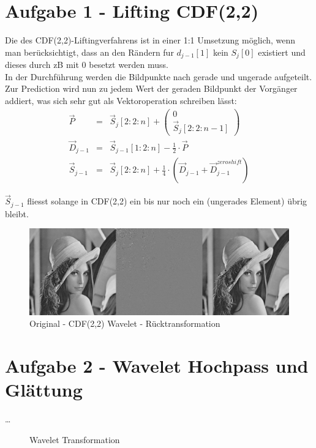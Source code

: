 



\newcommand{\nr}{5}
\lstset{language=matlab}


\section*{Aufgabe 1 - Lifting CDF(2,2)}
Die des CDF(2,2)-Liftingverfahrens ist in einer 1:1 Umsetzung m\"oglich,
wenn man ber\"ucksichtigt, dass an den R\"andern fur $d_{j-1}[1]$ kein
$S_{j}[0]$ existiert und dieses durch zB mit $0$ besetzt werden muss.
\\
In der Durchf\"uhrung werden die Bildpunkte nach gerade und ungerade 
aufgeteilt. Zur Prediction wird nun zu jedem Wert der geraden Bildpunkt 
der Vorg\"anger addiert, was sich sehr gut als Vektoroperation schreiben
l\"asst:
\\
\begin{eqnarray}
\vec{P} &=&  \vec{S}_{j}[2:2:n] + \left(\begin{array}{c}0\\\vec{S}_{j}[2:2:n-1]\end{array}\right)\\
\vec{D}_{j-1} &=&  \vec{S}_{j-1}[1:2:n] - \frac{1}{2} \cdot \vec{P}\\
\vec{S}_{j-1} &=&  \vec{S}_{j}[2:2:n] + \frac{1}{4} \cdot (\vec{D}_{j-1} + \vec{D}_{j-1}^{zeroshift})
\end{eqnarray}

$\vec{S}_{j-1}$ fliesst solange in CDF(2,2) ein bis nur noch ein (ungerades Element)
\"ubrig bleibt.


\begin{figure}[H]
\begin{center}
\includegraphics[width=150mm]{u05/task1.eps}
\end{center}
\caption{Original - CDF(2,2) Wavelet - R\"ucktransformation}
\end{figure}



\section*{Aufgabe 2 - Wavelet Hochpass und Gl\"attung}
\ldots
\begin{figure}[H]
\begin{center}
\end{center}
\caption{Wavelet Transformation}
\end{figure}


